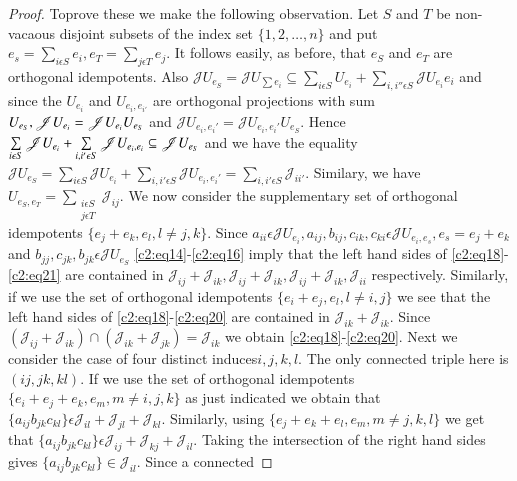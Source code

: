 \begin{proof}
To\pageoriginale prove these we make the following observation. Let $S$ and $T$ be
non-vacaous disjoint subsets of the index set $\{1,2,\ldots,n\}$ and
put $e_s=\sum\limits_{i\epsilon S}e_i,e_T=\sum\limits_{j\epsilon
  T}e_j$. It follows easily, as before, that $e_S$ and $e_T$ are
orthogonal idempotents. Also $\mathscr{J}U_{e_{S}}=\mathscr{J}U_{\sum
  e_{i}}\subseteq \sum\limits_{i\epsilon
  S}U_{e_{i}}+\sum\limits_{i,i''\epsilon S}\mathscr{J}U_{e_{i}}e_{i}$
and since the $U_{e_{i}}$ and $U_{e_{i},e_{i'}}$ are orthogonal
projections with sum
$U_{e_{S}},\mathscr{J}\break U_{e_{i}}=\mathscr{J}U_{e_{i}}U_{e_{S}}$ and
$\mathscr{J}U_{e_{i},e_{i}'}=\mathscr{J}U_{e_{i},e_{i}'}U_{e_{S}}$. Hence
$\sum\limits_{i\epsilon
  S}\mathscr{J}U_{e_{i}}+\sum\limits_{i,i'\epsilon S}\break\mathscr{J}
U_{e_{i},e_{i}}\subseteq \mathscr{J} U_{e_{S}}$ and we have the
equality $\mathscr{J}U_{e_{S}}=\sum\limits_{i\epsilon
  S}\mathscr{J}U_{e_{i}}+\sum\limits_{i,i'\epsilon
  S}\mathscr{J}U_{e_{i},e_{i}'}=\sum\limits_{i,i'\epsilon
  S}\mathscr{J}_{ii'}$. Similary, we have
$U_{e_{S},e_{T}}=\sum\limits_{\substack {i\epsilon S\\j\epsilon
    T}}\mathscr{J}_{ij}$. We now consider the supplementary set of
orthogonal idempotents $\{e_j+e_k,e_l,l \neq j,k\}$. Since
$a_{ii}\epsilon \mathscr{J} U_{e_{i}},a_{ij},b_{ij},
c_{ik},c_{ki}\epsilon \mathscr{J} U_{e_{i},e_{s}},e_s=e_j+e_k$ and
$b_{jj},c_{jk},b_{jk}\epsilon \mathscr{J} U_{e_{S}}$
\eqref{c2:eq14}-\eqref{c2:eq16} imply
that the left hand sides of \eqref{c2:eq18}-\eqref{c2:eq21} are contained in
$\mathscr{J}_{ij}+\mathscr{J}_{ik},\mathscr{J}_{ij}+\mathscr{J}_{ik},
\mathscr{J}_{ij}+\mathscr{J}_{ik},\mathscr{J}_{ii}$
respectively. Similarly, if we use the set of orthogonal idempotents
$\{e_i+e_j,e_l,l\neq i,j\}$ we see that the left hand sides of
\eqref{c2:eq18}-\eqref{c2:eq20} are contained in
$\mathscr{J}_{ik}+\mathscr{J}_{ik}$. Since 
$(\mathscr{J}_{ij}+\mathscr{J}_{ik})\cap(\mathscr{J}_{ik}+\mathscr{J}_{jk})=\mathscr{J}_{ik}$ 
we obtain \eqref{c2:eq18}-\eqref{c2:eq20}. Next we consider the case of four distinct
induces\pageoriginale $i,j,k,l$. The only connected triple here is
$(ij,jk,kl)$. If we use the set of orthogonal idempotents
$\{e_i+e_j+e_k,e_m,m\neq i,j,k\}$ as just indicated we obtain that
$\{a_{ij}b_{jk}c_{kl}\}\epsilon
\mathscr{J}_{il}+\mathscr{J}_{jl}+\mathscr{J}_{kl}$. Similarly, using
$\{e_j+e_k+e_l,e_m,m\neq j,k,l\}$ we get that
$\{a_{ij}b_{jk}c_{kl}\}\epsilon
\mathscr{J}_{ij}+\mathscr{J}_{kj}+\mathscr{J}_{il}$. Taking the
intersection of the right hand sides gives
$\{a_{ij}b_{jk}c_{kl}\}\in \mathscr{J}_{il}$. Since a connected

\end{proof}
